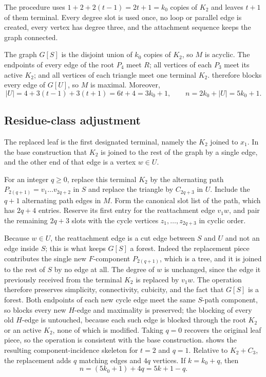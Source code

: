\documentclass[smallextended,natbib,nospthms]{svjour3}
\theoremstyle{definition}
\theoremstyle{remark}
\begin{document}
The procedure uses $1+2+2(t-1)=2t+1=k_0$ copies of $K_2$ and leaves
$t+1$ of them terminal. Every degree slot is used once, no loop or parallel
edge is created, every vertex has degree three, and the attachment sequence
keeps the graph connected.

The graph $G[S]$ is the disjoint union of $k_0$ copies of $K_2$, so $M$ is
acyclic. The endpoints of every edge of the root $P_4$ meet $R$; all vertices
of each $P_3$ meet its active $K_2$; and all vertices of each triangle meet
one terminal $K_2$.  therefore blocks every edge of
$G[U]$, so $M$ is maximal. Moreover,
\[
  |U|=4+3(t-1)+3(t+1)=6t+4=3k_0+1,
  \qquad
  n=2k_0+|U|=5k_0+1.
\]

\subsection{Residue-class adjustment}

The replaced leaf is the first designated terminal, namely the $K_2$ joined
to $x_1$. In the base construction that $K_2$ is joined to the rest of the
graph by a single edge, and the other end of that edge is a vertex $w\in U$.

For an integer $q\geq 0$, replace this terminal $K_2$ by the alternating path
$P_{2(q+1)}=v_1\ldots v_{2q+2}$ in $S$ and replace the triangle by $C_{2q+3}$
in $U$. Include the $q+1$ alternating path edges in $M$. Form the canonical
slot list of the path, which has $2q+4$ entries. Reserve its first entry
for the reattachment edge $v_1w$, and pair the remaining $2q+3$ slots with
the cycle vertices $z_1,\ldots,z_{2q+3}$ in cyclic order.

Because $w\in U$, the reattachment edge is a cut edge between $S$ and $U$ and
not an edge inside $S$; this is what keeps $G[S]$ a forest. Indeed the
replacement piece contributes the single new $F$-component $P_{2(q+1)}$, which
is a tree, and it is joined to the rest of $S$ by no edge at all. The degree
of $w$ is unchanged, since the edge it previously received from the terminal
$K_2$ is replaced by $v_1w$. The operation therefore preserves simplicity,
connectivity, cubicity, and the fact that $G[S]$ is a forest. Both endpoints
of each new cycle edge meet the same $S$-path component, so 
blocks every new $H$-edge and maximality is preserved; the blocking of every
old $H$-edge is untouched, because each such edge is blocked through the root
$K_2$ or an active $K_2$, none of which is modified. Taking $q=0$ recovers the
original leaf piece, so the operation is consistent with the base
construction.  shows the resulting
component-incidence skeleton for $t=2$ and $q=1$. Relative to $K_2+C_3$, the
replacement adds $q$ matching edges and $4q$ vertices. If $k=k_0+q$, then
\begin{equation}
  n=(5k_0+1)+4q=5k+1-q.
  \label{eq:residue}
\end{equation}
\end{document}
